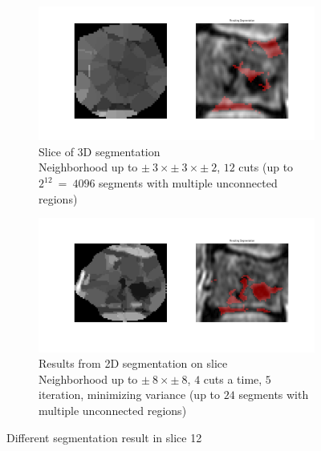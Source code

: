 \documentclass{article}
\begin{document}
\begin{figure}[h]
              
        \begin{subfigure}[t]{0.48\linewidth}
          \centering
          \includegraphics[width=\linewidth,trim={5cm 4cm 5cm 1cm},clip]{imgs/vars12}
          \caption{Slice of 3D segmentation\\
            Neighborhood up to $\pm~3 \times \pm~3 \times \pm~2$, $12$ cuts (up to $2^{12}~=~4096$ segments with multiple unconnected regions)
          }
        \end{subfigure}
        \hfill
        \begin{subfigure}[t]{0.48\linewidth}
          \centering
          \includegraphics[width=\linewidth,trim={5cm 2.6cm 5cm 2.4cm},clip]{imgs/vars12-2D}
          \caption{Results from 2D segmentation on slice\\
            Neighborhood up to $\pm~8 \times \pm~8$, $4$ cuts a time, $5$ iteration, minimizing variance (up to $24$ segments with multiple unconnected regions)
          }
        \end{subfigure}
        \caption{\label{fig:2D3D}
          Different segmentation result in slice 12}
      \end{figure}
  
\end{document}
